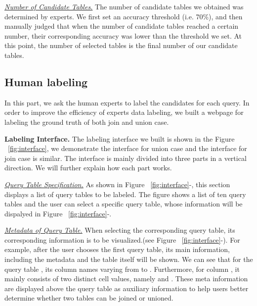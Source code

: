 \noindent  \underline{\textit{Number of Candidate Tables.}}  The number of candidate tables we obtained was determined by experts. We first set an accuracy threshold (i.e. 70\%), and then manually judged that when the number of candidate tables reached a certain number, their corresponding accuracy was lower than the threshold we set. At this point, the number of selected tables is the final number of our candidate tables.


\subsection{Human labeling}
In this part, we ask the human experts to label the candidates for each query. In order to improve the efficiency of experts data labeling, we built a webpage for labeling the ground truth of both join and union case.


\noindent \textbf{Labeling Interface.} 
The labeling interface we built is shown in the Figure ~\ref{fig:interface}, we demonstrate the interface for union case and the interface for join case is similar. The interface is mainly divided into three parts in a vertical direction. We will further explain how each part works.

\noindent \underline{\textit{Query Table Specification.}}  
As shown in Figure ~\ref{fig:interface}-, this section displays a list of query tables to be labeled.  The figure shows a list of ten query tables and the user can select a specific query table, whose information will be dispalyed in Figure ~\ref{fig:interface}-.

\noindent \underline{\textit{Metadata of Query Table.}}  When selecting the corresponding query table,  its corresponding information is to be visualized.(see Figure ~\ref{fig:interface}-). For example, after the user chooses the first query table, its main information, including the metadata and the table itself  will be shown. We can see that for the query table , its column names varying from  to . Furthermore, for column , it mainly consists of two distinct cell values, namely  and . These meta information are displayed above the query table as auxiliary information to help users better determine whether two tables can be joined or unioned.

